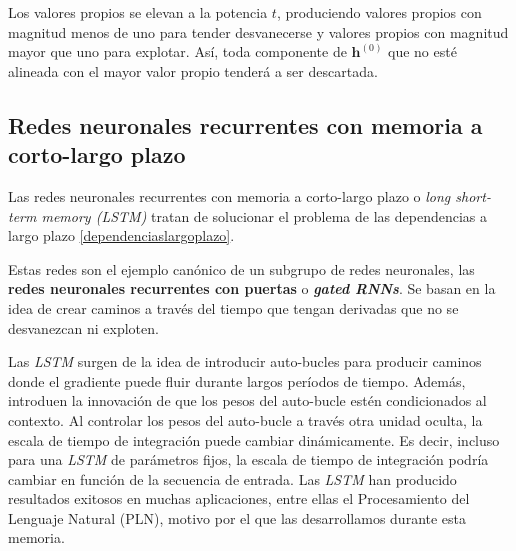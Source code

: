 	Los valores propios se elevan a la potencia $t$, produciendo valores propios con magnitud menos de uno para tender desvanecerse y valores propios con magnitud mayor que uno para explotar. Así, toda componente de $\textbf{h}^{(0)}$ que no esté alineada con el mayor valor propio tenderá a ser descartada.
	
	\subsection{Redes neuronales recurrentes con memoria a corto-largo plazo}
	
	Las redes neuronales recurrentes con memoria a corto-largo plazo o \textit{long short-term memory (LSTM)} tratan de solucionar el problema de las dependencias a largo plazo \ref{dependenciaslargoplazo}. 
	
	Estas redes son el ejemplo canónico de un subgrupo de redes neuronales, las \textbf{redes neuronales recurrentes con puertas} o \textit{\textbf{gated RNNs}}. Se basan en la idea de crear caminos a través del tiempo que tengan derivadas que no se desvanezcan ni exploten. 
	
	Las \textit{LSTM} surgen de la idea de introducir auto-bucles para producir caminos donde el gradiente puede fluir durante largos períodos de tiempo. Además, introduen la innovación de que los pesos del auto-bucle estén condicionados al contexto. Al controlar los pesos del auto-bucle a través otra  unidad oculta, la escala de tiempo de integración puede cambiar dinámicamente. Es decir, incluso para una \textit{LSTM} de parámetros fijos, la escala de tiempo de integración podría cambiar en función de la secuencia de entrada. Las \textit{LSTM} han producido resultados exitosos en muchas aplicaciones, entre ellas el Procesamiento del Lenguaje Natural (PLN), motivo por el que las desarrollamos durante esta memoria.
	
